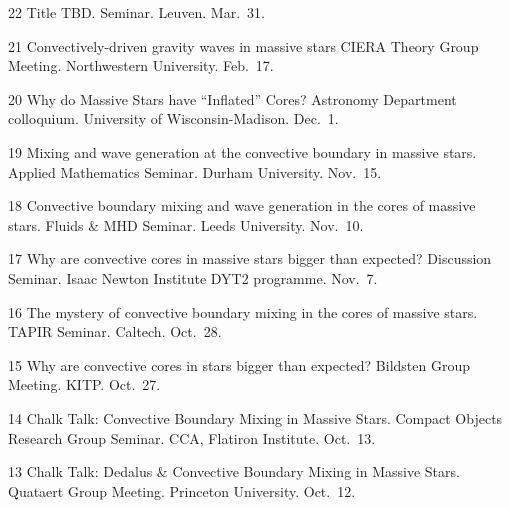 
      {22}
      { 
        Title TBD.
      }
      {
        Seminar. Leuven. Mar.~31.
      }

\cvpub{}
      {21}
      { 
        Convectively-driven gravity waves in massive stars
      }
      {
        CIERA Theory Group Meeting. Northwestern University. Feb.~17.
      }



      {20}
      { 
        Why do Massive Stars have ``Inflated'' Cores?
      }
      {
        Astronomy Department colloquium. University of Wisconsin-Madison. Dec.~1.
      }

\cvpub{}
      {19}
      {
        Mixing and wave generation at the convective boundary in massive stars.  
      }
      {
        Applied Mathematics Seminar. Durham University. Nov.~15.
      }

\cvpub{}
      {18}
      {
         Convective boundary mixing and wave generation in the cores of massive stars. 
      }
      {
        Fluids \& MHD Seminar. Leeds University. Nov.~10.
      }

\cvpub{}
      {17}
      {
        Why are convective cores in massive stars bigger than expected?  
      }
      {
        Discussion Seminar. Isaac Newton Institute DYT2 programme. Nov.~7.
      }



\cvpub{}
      {16}
      {
        The mystery of convective boundary mixing in the cores of massive stars.
      }
      {
        TAPIR Seminar. Caltech. Oct.~28.
      }

\cvpub{}
      {15}
      {
        Why are convective cores in stars bigger than expected?  
      }
      {
        Bildsten Group Meeting. KITP. Oct.~27.
      }

\cvpub{}
      {14}
      {
        Chalk Talk: Convective Boundary Mixing in Massive Stars.  
      }
      {
        Compact Objects Research Group Seminar. CCA, Flatiron Institute. Oct.~13.
      }

\cvpub{}
      {13}
      {
        Chalk Talk: Dedalus \& Convective Boundary Mixing in Massive Stars.  
      }
      {
        Quataert Group Meeting. Princeton University. Oct.~12.
      }



